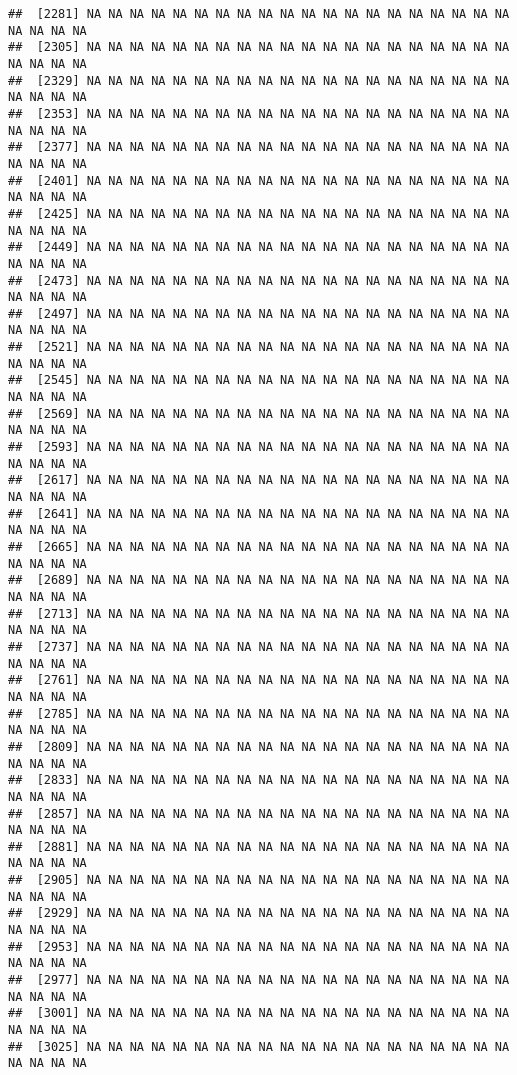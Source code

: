 \documentclass[
]{article}
\begin{document}
\begin{verbatim}
##  [2281] NA NA NA NA NA NA NA NA NA NA NA NA NA NA NA NA NA NA NA NA NA NA NA NA
##  [2305] NA NA NA NA NA NA NA NA NA NA NA NA NA NA NA NA NA NA NA NA NA NA NA NA
##  [2329] NA NA NA NA NA NA NA NA NA NA NA NA NA NA NA NA NA NA NA NA NA NA NA NA
##  [2353] NA NA NA NA NA NA NA NA NA NA NA NA NA NA NA NA NA NA NA NA NA NA NA NA
##  [2377] NA NA NA NA NA NA NA NA NA NA NA NA NA NA NA NA NA NA NA NA NA NA NA NA
##  [2401] NA NA NA NA NA NA NA NA NA NA NA NA NA NA NA NA NA NA NA NA NA NA NA NA
##  [2425] NA NA NA NA NA NA NA NA NA NA NA NA NA NA NA NA NA NA NA NA NA NA NA NA
##  [2449] NA NA NA NA NA NA NA NA NA NA NA NA NA NA NA NA NA NA NA NA NA NA NA NA
##  [2473] NA NA NA NA NA NA NA NA NA NA NA NA NA NA NA NA NA NA NA NA NA NA NA NA
##  [2497] NA NA NA NA NA NA NA NA NA NA NA NA NA NA NA NA NA NA NA NA NA NA NA NA
##  [2521] NA NA NA NA NA NA NA NA NA NA NA NA NA NA NA NA NA NA NA NA NA NA NA NA
##  [2545] NA NA NA NA NA NA NA NA NA NA NA NA NA NA NA NA NA NA NA NA NA NA NA NA
##  [2569] NA NA NA NA NA NA NA NA NA NA NA NA NA NA NA NA NA NA NA NA NA NA NA NA
##  [2593] NA NA NA NA NA NA NA NA NA NA NA NA NA NA NA NA NA NA NA NA NA NA NA NA
##  [2617] NA NA NA NA NA NA NA NA NA NA NA NA NA NA NA NA NA NA NA NA NA NA NA NA
##  [2641] NA NA NA NA NA NA NA NA NA NA NA NA NA NA NA NA NA NA NA NA NA NA NA NA
##  [2665] NA NA NA NA NA NA NA NA NA NA NA NA NA NA NA NA NA NA NA NA NA NA NA NA
##  [2689] NA NA NA NA NA NA NA NA NA NA NA NA NA NA NA NA NA NA NA NA NA NA NA NA
##  [2713] NA NA NA NA NA NA NA NA NA NA NA NA NA NA NA NA NA NA NA NA NA NA NA NA
##  [2737] NA NA NA NA NA NA NA NA NA NA NA NA NA NA NA NA NA NA NA NA NA NA NA NA
##  [2761] NA NA NA NA NA NA NA NA NA NA NA NA NA NA NA NA NA NA NA NA NA NA NA NA
##  [2785] NA NA NA NA NA NA NA NA NA NA NA NA NA NA NA NA NA NA NA NA NA NA NA NA
##  [2809] NA NA NA NA NA NA NA NA NA NA NA NA NA NA NA NA NA NA NA NA NA NA NA NA
##  [2833] NA NA NA NA NA NA NA NA NA NA NA NA NA NA NA NA NA NA NA NA NA NA NA NA
##  [2857] NA NA NA NA NA NA NA NA NA NA NA NA NA NA NA NA NA NA NA NA NA NA NA NA
##  [2881] NA NA NA NA NA NA NA NA NA NA NA NA NA NA NA NA NA NA NA NA NA NA NA NA
##  [2905] NA NA NA NA NA NA NA NA NA NA NA NA NA NA NA NA NA NA NA NA NA NA NA NA
##  [2929] NA NA NA NA NA NA NA NA NA NA NA NA NA NA NA NA NA NA NA NA NA NA NA NA
##  [2953] NA NA NA NA NA NA NA NA NA NA NA NA NA NA NA NA NA NA NA NA NA NA NA NA
##  [2977] NA NA NA NA NA NA NA NA NA NA NA NA NA NA NA NA NA NA NA NA NA NA NA NA
##  [3001] NA NA NA NA NA NA NA NA NA NA NA NA NA NA NA NA NA NA NA NA NA NA NA NA
##  [3025] NA NA NA NA NA NA NA NA NA NA NA NA NA NA NA NA NA NA NA NA NA NA NA NA

\end{verbatim}
\end{document}
